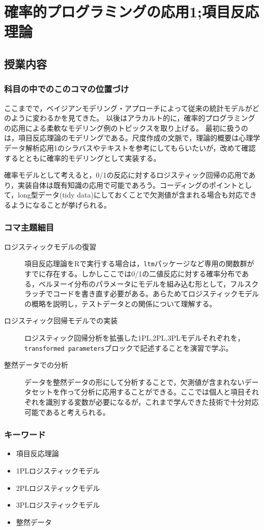 \section{確率的プログラミングの応用1;項目反応理論}
\subsection{授業内容}
\subsubsection{科目の中でのこのコマの位置づけ}
ここまでで，ベイジアンモデリング・アプローチによって従来の統計モデルがどのように変わるかを見てきた。
以後はアラカルト的に，確率的プログラミングの応用による柔軟なモデリング例のトピックスを取り上げる。
最初に扱うのは，項目反応理論のモデリングである。尺度作成の文脈で，理論的概要は心理学データ解析応用1のシラバスやテキストを参考にしてもらいたいが，改めて確認するとともに確率的モデリングとして実装する。

確率モデルとして考えると，0/1の反応に対するロジスティック回帰の応用であり，実装自体は既有知識の応用で可能であろう。コーディングのポイントとして，long型データ(tidy data)にしておくことで欠測値が含まれる場合も対応できるようになることが挙げられる。
\subsubsection{コマ主題細目}
\begin{description}
	\item[ロジスティックモデルの復習] 項目反応理論をRで実行する場合は，\verb|ltm|パッケージなど専用の関数群がすでに存在する。しかしここでは0/1の二値反応に対する確率分布である，ベルヌーイ分布のパラメータにモデルを組み込む形として，フルスクラッチでコードを書き直す必要がある。あらためてロジスティックモデルの概略を説明し，テストデータとの関係について理解する。
	\item[ロジスティック回帰モデルでの実装] ロジスティック回帰分析を拡張した1PL,2PL,3PLモデルそれぞれを，\verb|transformed parameters|ブロックで記述することを演習で学ぶ。
	\item[整然データでの分析] データを整然データの形にして分析することで，欠測値が含まれないデータセットを作って分析に応用することができる。ここでは個人と項目それぞれを識別する変数が必要になるが，これまで学んできた技術で十分対応可能であると考えられる。
\end{description}
\subsubsection{キーワード}
\begin{itemize}
	\item 項目反応理論
	\item 1PLロジスティックモデル
	\item 2PLロジスティックモデル
	\item 3PLロジスティックモデル
	\item 整然データ
\end{itemize}
